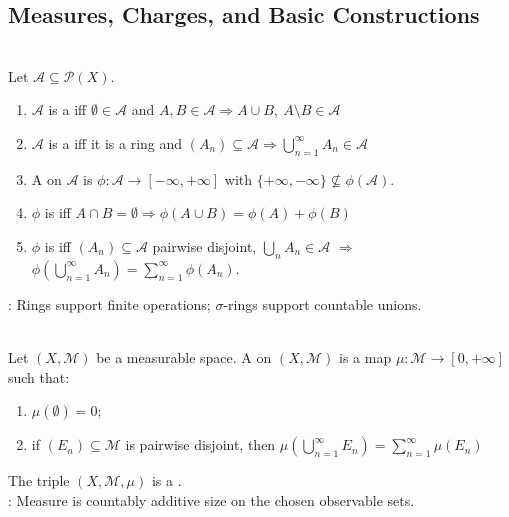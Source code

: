 \subsection{Measures, Charges, and Basic Constructions}

\begin{definition} \label{def:measure-measurability-core-source-todo}\label{def:ring-sigma-ring-set-function} \\
Let $\mathcal{A}\subseteq\mathcal{P}(X)$.
\begin{enumerate}[label=(\roman*)]
\setlength{\itemsep}{0pt}
\item $\mathcal{A}$ is a  iff $\emptyset\in\mathcal{A}$ and $A,B\in\mathcal{A}\Rightarrow A\cup B,\ A\setminus B\in\mathcal{A}$
\item $\mathcal{A}$ is a  iff it is a ring and $(A_n)\subseteq\mathcal{A}\Rightarrow\bigcup_{n=1}^{\infty}A_n\in\mathcal{A}$
\item A  on $\mathcal{A}$ is $\phi:\mathcal{A}\to[-\infty,+\infty]$ with $\{+\infty,-\infty\}\nsubseteq\phi(\mathcal{A})$.
\item $\phi$ is  iff $A\cap B=\emptyset\Rightarrow\phi(A\cup B)=\phi(A)+\phi(B)$
\item $\phi$ is  iff $(A_n)\subseteq\mathcal{A}$ pairwise disjoint, $\bigcup_nA_n\in\mathcal{A}$ $\Rightarrow$ $\phi\left(\bigcup_{n=1}^{\infty}A_n\right)=\sum_{n=1}^{\infty}\phi(A_n)$.
\end{enumerate}
: Rings support finite operations; $\sigma$-rings support countable unions.
\end{definition}

\begin{definition} \label{def:abstract-measure-on-measurable-space} \\
Let $(X,\mathcal{M})$ be a measurable space. A  on $(X,\mathcal{M})$ is a map $\mu:\mathcal{M}\to[0,+\infty]$ such that:
\begin{enumerate}[label=(\roman*)]
\setlength{\itemsep}{0pt}
\item $\mu(\emptyset)=0$;
\item if $(E_n)\subseteq\mathcal{M}$ is pairwise disjoint, then $\mu\left(\bigcup_{n=1}^{\infty}E_n\right)=\sum_{n=1}^{\infty}\mu(E_n)$
\end{enumerate}
The triple $(X,\mathcal{M},\mu)$ is a .\\
: Measure is countably additive size on the chosen observable sets.
\end{definition}


